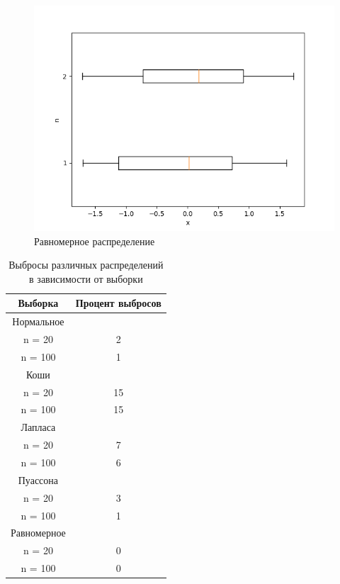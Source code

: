 \documentclass[a4]{article}
\begin{document}
\begin{center}
\begin{figure}[h]
					\includegraphics[width=\textwidth]{uniform.png}
					\caption[Равномерное распределение]{Равномерное распределение}
				\end{figure}
	
		\end{center}
		\newpage
		\begin{table}[h]
			
			\caption{Выбросы различных распределений в зависимости от выборки}
			\label{tab:my_label}
			\begin{center}
				\vspace{5mm}
				\begin{tabular}{|c|c|}
					\hline
					Выборка & Процент выбросов\\
					\hline
					Нормальное	&\\
					\hline
					n = 20   & 	2    \\
					\hline
					n = 100   &	1    \\
					\hline
					Коши	&\\
					\hline
					n = 20   & 	15    \\
					\hline
					n = 100  & 	15    \\
					\hline
					Лапласа	&\\
					\hline
					n = 20    &	7    \\
					\hline
					n = 100   &	6    \\
					\hline
					Пуассона	&\\
					\hline
					n = 20   & 	3    \\
					\hline
					n = 100  & 	1    \\
					\hline
					Равномерное	&\\
					\hline
					n = 20    &	0    \\
					\hline
					n = 100   &	0   \\ 
					\hline
				\end{tabular}
				
			\end{center}
			
		\end{table}
		
\end{document}
